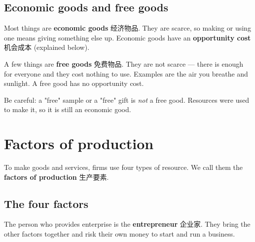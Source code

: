 \documentclass[11pt]{article}
\begin{document}
\subsection*{Economic goods and free goods}

Most things are \textbf{economic goods} 经济物品. They are scarce, so making or using one means giving something else up. Economic goods have an \textbf{opportunity cost} 机会成本 (explained below).

A few things are \textbf{free goods} 免费物品. They are not scarce — there is enough for everyone and they cost nothing to use. Examples are the air you breathe and sunlight. A free good has no opportunity cost.

Be careful: a "free" sample or a "free" gift is \emph{not} a free good. Resources were used to make it, so it is still an economic good.

\section*{Factors of production}

To make goods and services, firms use four types of resource. We call them the \textbf{factors of production} 生产要素.

\subsection*{The four factors}

\begin{center}
\end{center}

The person who provides enterprise is the \textbf{entrepreneur} 企业家. They bring the other factors together and risk their own money to start and run a business.
\end{document}
